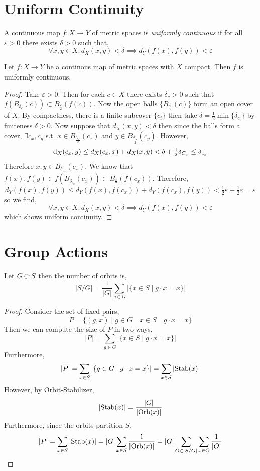 \documentclass[12]{article}
\begin{document}
\section{Uniform Continuity}

\begin{defn}
A continuous map $f : X \to Y$ of metric spaces is \textit{uniformly continuous} if for all $\varepsilon > 0$ there exists $\delta > 0$ such that,
\[ \forall x,y \in X : d_X(x, y) < \delta \implies d_Y(f(x), f(y)) < \varepsilon \]
\end{defn}

\begin{lemma}
Let $f : X \to Y$ be a continous map of metric spaces with $X$ compact. Then $f$ is uniformly continuous.
\end{lemma}

\begin{proof}
Take $\varepsilon > 0$. Then for each $c \in X$ there exists $\delta_c > 0$ such that $f(B_{\delta_c}(c)) \subset B_{\frac{\varepsilon}{2}}(f(c))$. Now the open balls $\{ B_{\frac{\delta_c}{2}}(c) \}$ form an open cover of $X$. By compactness, there is a finite subcover $\{ c_i \}$ then take $\delta = \tfrac{1}{2} \min \{ \delta_{c_i} \}$ by finiteness $\delta > 0$. Now suppose that $d_X(x, y) < \delta$ then since the balls form a cover, $\exists c_x, c_y$ s.t. $x \in B_{\frac{\delta_{c_x}}{2}}(c_x)$ and $y \in B_{\frac{\delta_{c_y}}{2}}(c_y)$. However,
\[ \mathrm{d}_X(c_x, y) \le d_X(c_x, x) + d_X(x, y) < \delta + \tfrac{1}{2} \delta_{C_x} \le \delta_{c_x} \]
Therefore $x,y \in B_{\delta_{c_x}}(c_x)$. We know that $f(x), f(y) \in f(B_{\delta_{c_x}}(c_x)) \subset B_{\frac{\varepsilon}{2}}(f(c_x))$. Therefore,
\[ d_Y(f(x), f(y)) \le d_Y(f(x), f(c_x)) + d_Y(f(c_x), f(y)) < \tfrac{1}{2} \varepsilon + \tfrac{1}{2} \varepsilon = \varepsilon \]
so we find,
\[ \forall x, y \in X : d_X(x, y) < \delta \implies d_Y(f(x), f(y)) < \varepsilon \]
which shows uniform continuity.
\end{proof}

\section{Group Actions}


\begin{lemma}[Burnside]
Let $G \acts S$ then the number of orbits is,
\[ |S/G| = \frac{1}{|G|} \sum_{g \in G} |\{ x \in S \mid g \cdot x = x \}| \]
\end{lemma}

\begin{proof}
Consider the set of fixed pairs,
\[ P = \{ (g, x) \mid g \in G \quad x \in S \quad g \cdot x = x \} \]
Then we can compute the size of $P$ in two ways, 
\[ |P| = \sum_{g \in G} | \{ x \in S \mid g \cdot x = x \} | \]
Furthermore,
\[ |P| = \sum_{x \in S} | \{ g \in G \mid g \cdot x = x \} | = \sum_{x \in S} | \mathrm{Stab}(x) | \]
However, by Orbit-Stabilizer,
\[ |\mathrm{Stab}(x)| = \frac{|G|}{|\mathrm{Orb}(x)|} \]
Furthermore, since the orbits partition $S$,
\[ |P| = \sum_{x \in S} |\mathrm{Stab}(x)| = |G| \sum_{x \in S} \frac{1}{|\mathrm{Orb}(x)|} = |G| \sum_{O \in |S/G|} \sum_{x \in O} \frac{1}{|O|} \] 
\end{proof}
\end{document}
